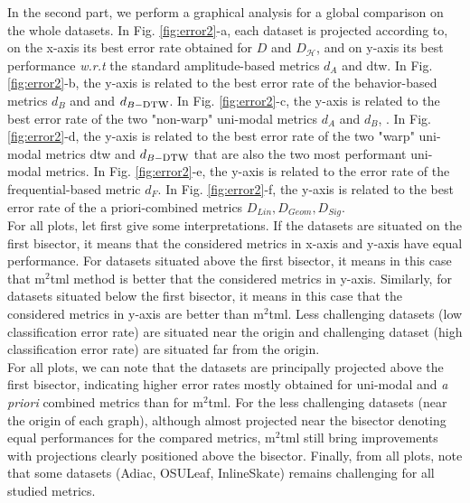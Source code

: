 In the second part,  we perform a graphical analysis for a global comparison on the whole datasets.  In Fig. \ref{fig:error2}-a,  each dataset is projected according to, on the x-axis its best error rate obtained for $D$ and  $D_{\mathcal{H}}$, and on y-axis  its best performance \textit{w.r.t}  the standard amplitude-based metrics $d_A$  and  {\sc dtw}. 
In Fig. \ref{fig:error2}-b, the y-axis is related to the best error rate of the behavior-based metrics $d_B$  and  and $d_{B-\mbox{\sc dtw}}$.
In Fig. \ref{fig:error2}-c,  the y-axis is related to the best error rate of the two "non-warp" uni-modal metrics $d_A$ and $d_{B}$, .
In Fig. \ref{fig:error2}-d,  the y-axis is related to the best error rate of the two "warp" uni-modal metrics {\sc dtw} and $d_{B-\mbox{\sc dtw}}$ that are also the two most performant uni-modal metrics.
In Fig. \ref{fig:error2}-e,  the y-axis is related to the error rate of the frequential-based metric $d_F$. 
In Fig. \ref{fig:error2}-f,  the y-axis is related to the best error rate of the a priori-combined metrics $D_{Lin}, D_{Geom}, D_{Sig}$. \\
For all plots, let first give some interpretations. If the datasets are situated on the first bisector, it means that the considered metrics in x-axis and y-axis have equal performance. For datasets situated above the first bisector, it means in this case that {\sc m$^2$tml} method is better that the considered metrics in y-axis. Similarly, for datasets situated below the first bisector, it means in this case that the considered metrics in y-axis are better than {\sc m$^2$tml}. Less challenging datasets (low classification error rate) are situated near the origin and challenging dataset (high classification error rate) are situated far from the origin. \\
For all plots, we can note that the datasets are principally  projected above the first bisector, indicating higher error rates mostly obtained for uni-modal and \textit{a priori} combined metrics than for {\sc m}$^2${\sc tml}. For the less challenging datasets (near the origin of each graph), although almost projected near the bisector denoting equal performances for the compared metrics, {\sc m}$^2${\sc tml}  still  bring improvements with projections clearly positioned  above the bisector. Finally, from all plots, note that some datasets (Adiac, OSULeaf, InlineSkate) remains challenging for all studied metrics.


